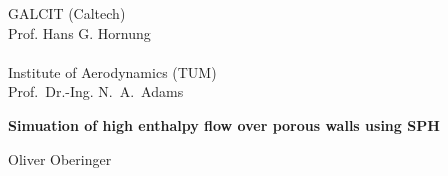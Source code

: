 


% 

\pagestyle{empty}

\begin{center}

\vspace*{-2.8cm}
\begin{minipage}[c]{.30\textwidth}
\end{minipage}
\begin{minipage}[c]{.43\textwidth}
\vspace*{1em}
    {GALCIT (Caltech)\\Prof. Hans G. Hornung \\ \\ Institute of Aerodynamics (TUM) \\ Prof.~Dr.-Ing. N.~A.~Adams}%
\end{minipage}
\begin{minipage}[c]{.25\textwidth}
\end{minipage}

\vspace*{3.3cm}
\begin{minipage}[c]{11cm}
{\LARGE\bf 
Simuation of high enthalpy flow over porous walls using SPH}
\end{minipage}

\vspace*{0.8cm}
Oliver Oberinger\\


\end{center}
